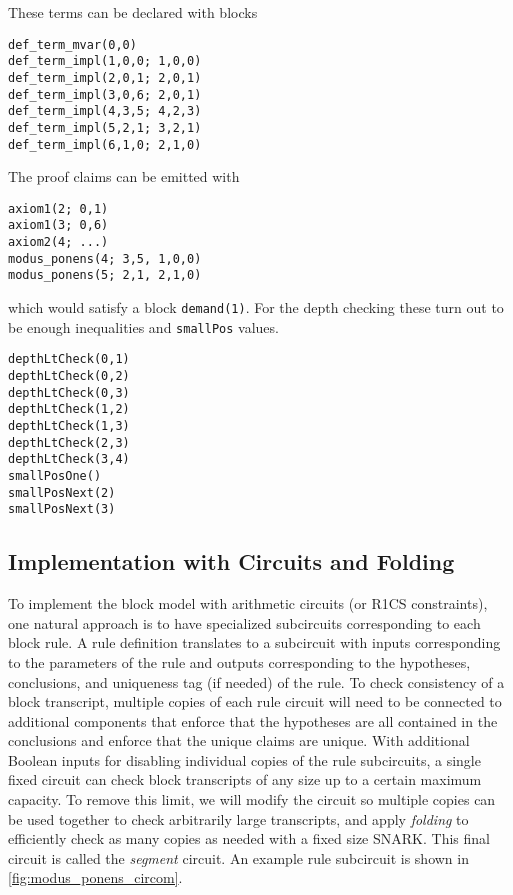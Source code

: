 \documentclass{article}
\theoremstyle{plain}
\theoremstyle{definition}
\begin{document}
These terms can be declared with blocks

\begin{verbatim}
def_term_mvar(0,0)
def_term_impl(1,0,0; 1,0,0)
def_term_impl(2,0,1; 2,0,1)
def_term_impl(3,0,6; 2,0,1)
def_term_impl(4,3,5; 4,2,3)
def_term_impl(5,2,1; 3,2,1)
def_term_impl(6,1,0; 2,1,0)
\end{verbatim}

The proof claims can be emitted with

\begin{verbatim}
axiom1(2; 0,1)
axiom1(3; 0,6)
axiom2(4; ...)
modus_ponens(4; 3,5, 1,0,0)
modus_ponens(5; 2,1, 2,1,0)
\end{verbatim}

\noindent
which would satisfy a block \texttt{demand(1)}. For the depth checking
these turn out to be enough inequalities and \texttt{smallPos} values.

\begin{verbatim}
depthLtCheck(0,1)
depthLtCheck(0,2)
depthLtCheck(0,3)
depthLtCheck(1,2)
depthLtCheck(1,3)
depthLtCheck(2,3)
depthLtCheck(3,4)
smallPosOne()
smallPosNext(2)
smallPosNext(3)
\end{verbatim}
\subsection{Implementation with Circuits and Folding}\label{block-implementation-folding}

To implement the block model with arithmetic circuits (or R1CS constraints),
one natural approach is to have specialized subcircuits corresponding to
each block rule.
A rule definition translates to a subcircuit with inputs corresponding to
the parameters of the rule and outputs corresponding to the hypotheses, conclusions,
and uniqueness tag (if needed) of the rule.
To check consistency of a block transcript, multiple copies of each rule circuit
will need to be connected to additional components that enforce that the hypotheses
are all contained in the conclusions and enforce that the unique claims are unique.
With additional Boolean inputs for disabling individual copies of the rule subcircuits,
a single fixed circuit can check block transcripts of any size up to a certain
maximum capacity.
To remove this limit, we will modify the circuit so multiple copies can be used
together to check arbitrarily large transcripts, and apply \emph{folding} \cite{Nova}
to efficiently check as many copies as needed with a fixed size SNARK.
This final circuit is called the \emph{segment} circuit.
An example rule subcircuit is shown in \cref{fig:modus_ponens_circom}.
\end{document}
